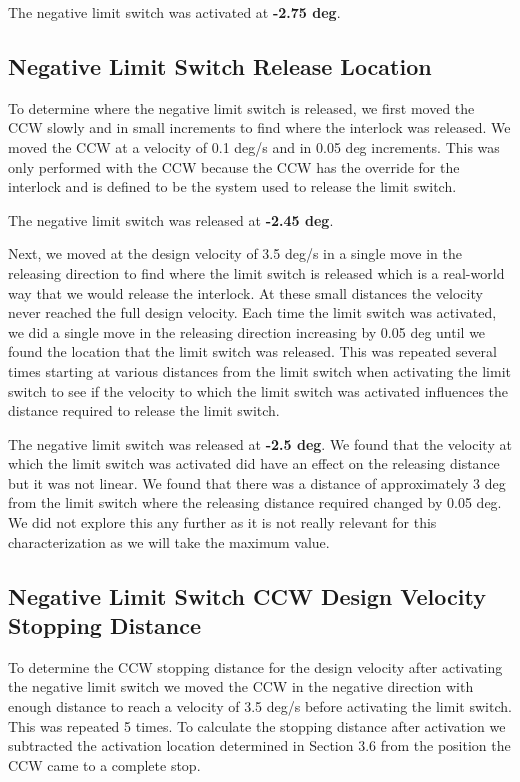 \documentclass[SE,lsstdraft,authoryear,toc]{lsstdoc}
\begin{document}
The negative limit switch was activated at \textbf{-2.75 deg}.

\subsection{Negative Limit Switch Release Location}

To determine where the negative limit switch is released, we first moved
the CCW slowly and in small increments to find where the interlock was
released. We moved the CCW at a velocity of 0.1 deg/s and in 0.05 deg
increments. This was only performed with the CCW because the CCW has the
override for the interlock and is defined to be the system used to
release the limit switch.

The negative limit switch was released at \textbf{-2.45 deg}.

Next, we moved at the design velocity of 3.5 deg/s in a single move in
the releasing direction to find where the limit switch is released which
is a real-world way that we would release the interlock. At these small
distances the velocity never reached the full design velocity. Each time
the limit switch was activated, we did a single move in the releasing
direction increasing by 0.05 deg until we found the location that the
limit switch was released. This was repeated several times starting at
various distances from the limit switch when activating the limit switch
to see if the velocity to which the limit switch was activated
influences the distance required to release the limit switch.

The negative limit switch was released at \textbf{-2.5 deg}. We found
that the velocity at which the limit switch was activated did have an
effect on the releasing distance but it was not linear. We found that
there was a distance of approximately 3 deg from the limit switch where
the releasing distance required changed by 0.05 deg. We did not explore
this any further as it is not really relevant for this characterization
as we will take the maximum value.

\subsection{Negative Limit Switch CCW Design Velocity Stopping Distance}

To determine the CCW stopping distance for the design velocity after
activating the negative limit switch we moved the CCW in the negative
direction with enough distance to reach a velocity of 3.5 deg/s before
activating the limit switch. This was repeated 5 times. To
calculate the stopping distance after activation we subtracted the
activation location determined in Section 3.6 from the position the CCW
came to a complete stop.
\end{document}
